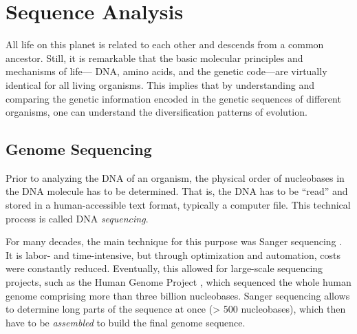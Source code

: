 \section{Sequence Analysis}
\label{ch:Foundations:sec:SequenceAnalysis}

All life on this planet is related to each other and descends from a common ancestor.
Still, it is remarkable that the basic molecular principles and mechanisms of life---%
DNA, amino acids, and the genetic code---are virtually identical for all living organisms.
This implies that by understanding and comparing the genetic information
encoded in the genetic sequences of different organisms,
one can understand the diversification patterns of evolution.


\subsection{Genome Sequencing}
\label{ch:Foundations:sec:SequenceAnalysis:sub:GenomeSequencing}

Prior to analyzing the DNA of an organism, the physical order of nucleobases in the DNA molecule has to be determined.
That is, the DNA has to be ``read'' and stored in a human-accessible text format, typically a computer file.
This technical process is called DNA \emph{sequencing}.

For many decades, the main technique for this purpose was Sanger sequencing \cite{Sanger1975,Sanger1977}.
It is labor- and time-intensive, but through optimization and automation, costs were constantly reduced.
Eventually, this allowed for large-scale sequencing projects, such as the Human Genome Project \cite{Venter2001},
which sequenced the whole human genome comprising more than three billion nucleobases.
Sanger sequencing allows to determine long parts of the sequence at once (> \num{500} nucleobases),
which then have to be \emph{assembled} to build the final genome sequence.

